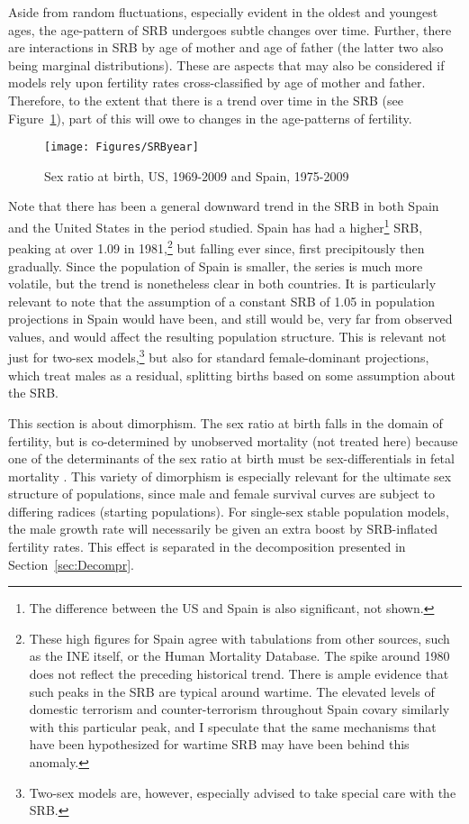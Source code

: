 Aside from random fluctuations, especially evident in the oldest and youngest
ages, the age-pattern of SRB undergoes subtle changes over time. Further, there
are interactions in SRB by age of mother and age of father (the latter two
also being marginal distributions). These are aspects that may also be
considered if models rely upon fertility rates cross-classified by age of mother
and father. Therefore, to the extent that there is a trend over time in the SRB
(see Figure~\ref{fig:SRByears}), part of this will owe to changes in the
age-patterns of fertility.

\begin{figure}[ht!]
        \centering  
          \caption{Sex ratio at birth, US, 1969-2009 and Spain,
          1975-2009}
           \texttt{[image: Figures/SRByear]}
          \label{fig:SRByears}
\end{figure}

Note that there has been a general downward trend in the SRB in both Spain and
the United States in the period studied. Spain has had a
higher\footnote{The difference between the US and Spain is also significant, not
shown.} SRB, peaking at over 1.09 in 1981,\footnote{These high figures for
Spain agree with tabulations from other sources, such as the INE itself, or the
Human Mortality Database. The spike around 1980 does not reflect the
preceding historical trend. There is ample evidence that such peaks in the SRB
are typical around wartime\citep{james2009variations}. The elevated levels of
domestic terrorism and counter-terrorism throughout Spain covary similarly with
this particular peak, and I speculate that the same mechanisms
that have been hypothesized for wartime SRB may have been behind this anomaly.} 
but falling ever since,
first precipitously then gradually. Since the population of Spain is smaller, the series 
is much more volatile, but the trend is nonetheless clear in both countries. It 
is particularly relevant to note that the assumption of a constant SRB of 1.05 in
 population projections in Spain would have been, and still would be, very far
 from observed values, and would affect the resulting population structure. This is 
 relevant not just for two-sex models,\footnote{Two-sex models are, however,
 especially advised to take special care with the SRB.} but also for standard female-dominant 
 projections, which treat males as a residual, splitting births based on some
assumption about the SRB.

This section is about dimorphism. The sex ratio at birth
falls in the domain of fertility, but is co-determined by unobserved mortality
(not treated here) because one of the determinants of the sex ratio at birth
must be sex-differentials in fetal mortality \citep{hassold1983sex}. This
variety of dimorphism is especially relevant for the ultimate sex structure of populations, since 
male and female survival curves are subject 
to differing radices (starting populations). For single-sex stable population
models, the male growth rate will necessarily be given an extra boost by SRB-inflated fertility
rates. This effect is separated in the decomposition presented in
Section~\ref{sec:Decompr}.
